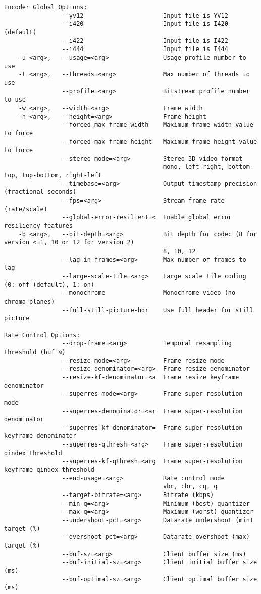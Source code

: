 \begin{appendices}
\begin{lstlisting}
Encoder Global Options:
                --yv12                      Input file is YV12 
                --i420                      Input file is I420 (default)
                --i422                      Input file is I422
                --i444                      Input file is I444
    -u <arg>,   --usage=<arg>               Usage profile number to use
    -t <arg>,   --threads=<arg>             Max number of threads to use
                --profile=<arg>             Bitstream profile number to use
    -w <arg>,   --width=<arg>               Frame width
    -h <arg>,   --height=<arg>              Frame height
                --forced_max_frame_width    Maximum frame width value to force
                --forced_max_frame_height   Maximum frame height value to force
                --stereo-mode=<arg>         Stereo 3D video format
                                            mono, left-right, bottom-top, top-bottom, right-left
                --timebase=<arg>            Output timestamp precision (fractional seconds)
                --fps=<arg>                 Stream frame rate (rate/scale)
                --global-error-resilient=<  Enable global error resiliency features
    -b <arg>,   --bit-depth=<arg>           Bit depth for codec (8 for version <=1, 10 or 12 for version 2)
                                            8, 10, 12
                --lag-in-frames=<arg>       Max number of frames to lag
                --large-scale-tile=<arg>    Large scale tile coding (0: off (default), 1: on)
                --monochrome                Monochrome video (no chroma planes)
                --full-still-picture-hdr    Use full header for still picture

Rate Control Options:
                --drop-frame=<arg>          Temporal resampling threshold (buf %)
                --resize-mode=<arg>         Frame resize mode
                --resize-denominator=<arg>  Frame resize denominator
                --resize-kf-denominator=<a  Frame resize keyframe denominator
                --superres-mode=<arg>       Frame super-resolution mode
                --superres-denominator=<ar  Frame super-resolution denominator
                --superres-kf-denominator=  Frame super-resolution keyframe denominator
                --superres-qthresh=<arg>    Frame super-resolution qindex threshold
                --superres-kf-qthresh=<arg  Frame super-resolution keyframe qindex threshold
                --end-usage=<arg>           Rate control mode
                                            vbr, cbr, cq, q
                --target-bitrate=<arg>      Bitrate (kbps)
                --min-q=<arg>               Minimum (best) quantizer
                --max-q=<arg>               Maximum (worst) quantizer
                --undershoot-pct=<arg>      Datarate undershoot (min) target (%)
                --overshoot-pct=<arg>       Datarate overshoot (max) target (%)
                --buf-sz=<arg>              Client buffer size (ms)
                --buf-initial-sz=<arg>      Client initial buffer size (ms)
                --buf-optimal-sz=<arg>      Client optimal buffer size (ms)


\end{lstlisting}
\end{appendices}
